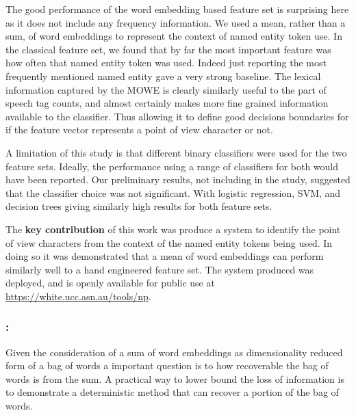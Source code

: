 \documentclass{book}
\begin{document}
The good performance of the word embedding based feature set is surprising here as it does not include any frequency information.
We used a mean, rather than a sum, of word embeddings to represent the context of named entity token use.
In the classical feature set, we found that by far the most important feature was how often that named entity token was used.
Indeed just reporting the most frequently mentioned named entity gave a very strong baseline.
The lexical information captured by the MOWE is clearly similarly useful to the part of speech tag counts, and almost certainly makes more fine grained information available to the classifier.
Thus allowing it to define good decisions boundaries for if the feature vector represents a point of view character or not.


A limitation of this study is that different binary classifiers were used for the two feature sets.
Ideally, the performance using a range of classifiers for both would have been reported.
Our preliminary results, not including in the study, suggested that the classifier choice was not significant.
With logistic regression, SVM, and decision trees giving similarly high results for both feature sets.
 



The \textbf{key contribution} of this work was produce a system to identify the point of view characters from the context of the named entity tokens being used.
In doing so it was demonstrated that a mean of word embeddings can perform similarly well to a hand engineered feature set.
The system produced was deployed, and is openly available for public use at \url{https://white.ucc.asn.au/tools/np}.


\subsubsection{: }
Given the consideration of a sum of word embeddings as dimensionality reduced form of a bag of words
a important question is to how recoverable the bag of words is from the sum.
A practical way to lower bound the loss of information
is to demonstrate a deterministic method that can recover a portion of the bag of words.
\end{document}
